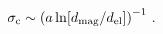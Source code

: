 \begin{equation}
\sigma_\mathrm{c} \sim 
\left( a \ln[d_{\rm mag}/d_{\rm el}] \right)^{-1} \, .
\label{eq39}
\end{equation}

